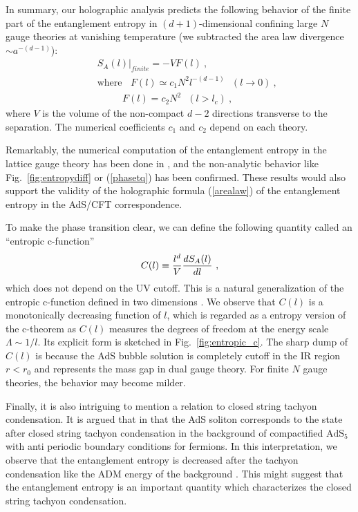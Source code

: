 \documentclass[12pt]{article}
\def\frac#1#2{{#1\over #2}}
\def\f {\frac}
\def\no{\nonumber \\}
\def\frac#1#2{{#1\over #2}}
\def\ba{\begin{eqnarray}}
\def\ea{\end{eqnarray}}
\begin{document}
In summary, our holographic analysis predicts the following behavior of the finite part of the
entanglement entropy in $(d+1)$-dimensional
confining large $N$ gauge theories
at vanishing temperature (we subtracted the area law divergence $\sim a^{-(d-1)}$):
\ba
&& S_A(l)|_{finite}=-VF(l)\ ,\no
&&\mbox{where}\ \ \ \  F(l)\simeq c_1 N^2 l^{-(d-1)} \ \ \ (l\to 0)\ ,\no
&& \ \ \ \ \ \ \ \ \ \ \ \,   F(l)= c_2 N^2 \ \ \ (l>l_c)\ , \label{phasetq}
\ea
where $V$ is the volume of the non-compact $d-2$ directions transverse to the separation.
The numerical coefficients $c_1$ and $c_2$ depend on each theory.

Remarkably, the numerical computation of the entanglement entropy in the lattice gauge theory
has been done in \cite{Velytsky:2008rs,Buividovich:2008kq,Buividovich:2008gq,Buividovich:2008yv}, and
the non-analytic behavior like Fig.\ \ref{fig:entropydiff} or (\ref{phasetq}) has been confirmed.
These results would also support the validity of the holographic formula (\ref{arealaw}) of
the entanglement entropy in the AdS/CFT correspondence.

To make the phase transition clear,
we can define the following quantity called an ``entropic c-function''
\begin{align}
    C(l) \equiv \f{l^{d}}{V}\f{dS_A(l)}{dl} \ ,
\end{align}
which does not depend on the UV cutoff. This is a natural generalization
of the entropic c-function defined in two dimensions \cite{Casinicth,Casini:2006es}.
 We observe that $C(l)$ is a monotonically decreasing
function of $l$, which is regarded as a entropy version of the c-theorem as
$C(l)$ measures the degrees of freedom at the energy scale $\Lambda \sim 1/l$.
Its explicit form is sketched in Fig.\ \ref{fig:entropic_c}.
The sharp dump of $C(l)$ is because the AdS bubble solution is completely cutoff
in the IR region $r< r_0$ and represents the mass gap in dual gauge theory. For finite $N$ gauge theories,
the behavior may become milder.

Finally, it is also intriguing to mention
a relation
to closed string tachyon condensation. It is argued that in \cite{HoSi} that the
AdS soliton corresponds to the state after closed string tachyon condensation in the background of
compactified $\mathrm{AdS}_5$ with anti periodic boundary conditions for fermions.
In this interpretation, we observe that the entanglement
entropy is decreased after the tachyon condensation like the ADM energy \cite{Energy} of the
background \cite{Nishioka:2006gr}. This might suggest that the
entanglement entropy is an important quantity which characterizes the closed string tachyon condensation.
\end{document}
